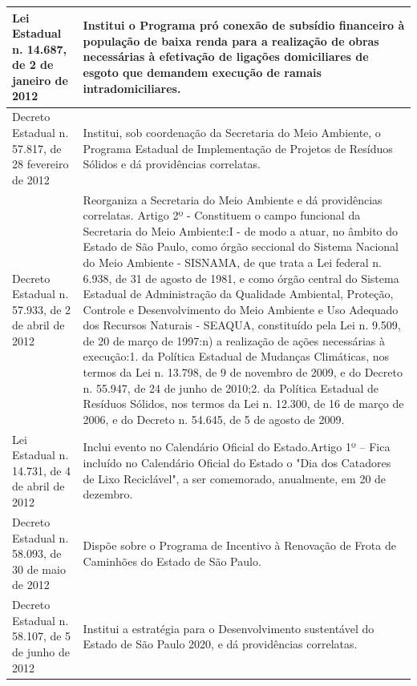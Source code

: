 \begin{center}
\begin{longtable}{|p{}|p{}|}
			\hline
			Lei Estadual n. 14.687, de 2 de janeiro de 2012 & Institui  o  Programa  pró  conexão  de  subsídio  financeiro  à  população  de  baixa renda   para   a   realização   de   obras   necessárias   à   efetivação   de   ligações domiciliares de esgoto que demandem execução de ramais intradomiciliares. \\
			\hline
			Decreto Estadual n. 57.817, de 28 fevereiro de 2012 & Institui, sob coordenação da Secretaria do Meio Ambiente, o Programa Estadual de   Implementação   de   Projetos   de   Resíduos   Sólidos   e   dá   providências correlatas. \\
			\hline
			Decreto Estadual n. 57.933, de 2 de abril de 2012 & Reorganiza a Secretaria do Meio Ambiente e dá providências correlatas. Artigo 2º - Constituem o campo funcional da Secretaria do Meio Ambiente:\newline{}I - de modo a atuar, no âmbito do Estado de São Paulo, como órgão seccional do Sistema Nacional do Meio Ambiente - SISNAMA, de que trata a Lei federal n. 6.938, de 31 de agosto de 1981, e como órgão central do Sistema Estadual de Administração da Qualidade Ambiental, Proteção, Controle e Desenvolvimento do   Meio   Ambiente   e   Uso   Adequado   dos   Recursos   Naturais   -   SEAQUA, constituído pela Lei n. 9.509, de 20 de março de 1997:\newline{}n) a realização de ações necessárias à execução:\newline{}1. da Política Estadual de Mudanças Climáticas, nos termos da Lei n. 13.798, de 9 de novembro de 2009, e do Decreto n. 55.947, de 24 de junho de 2010;\newline{}2. da Política Estadual de Resíduos Sólidos, nos termos da Lei n. 12.300, de 16 de março de 2006, e do Decreto n. 54.645, de 5 de agosto de 2009. \\
			\hline
			Lei Estadual n. 14.731, de 4 de abril de 2012 & Inclui evento no Calendário Oficial do Estado.\newline{}Artigo 1º – Fica incluído no Calendário Oficial do Estado o "Dia dos Catadores de Lixo Reciclável", a ser comemorado, anualmente, em 20 de dezembro. \\
			\hline
			Decreto Estadual n. 58.093, de 30 de maio de 2012 & Dispõe sobre o Programa de Incentivo à Renovação de Frota de Caminhões do Estado de São Paulo. \\
			\hline
			Decreto Estadual n. 58.107, de 5 de junho de 2012 & Institui a estratégia para o Desenvolvimento sustentável do Estado de São Paulo 2020, e dá providências correlatas. \\

\end{longtable}
\end{center}
